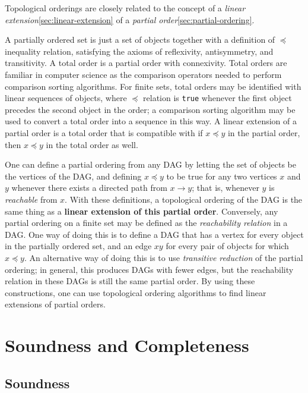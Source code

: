 Topological orderings are closely related to the concept of a
\textit{linear extension}\ref{sec:linear-extension} of a
\textit{partial order}\ref{sec:partial-ordering}.

A partially ordered set is just a set of objects together with a
definition of $\preceq$ inequality relation, satisfying the axioms of
reflexivity, antisymmetry, and transitivity. A total order is a
partial order with connexivity. Total orders are familiar in computer
science as the comparison operators needed to perform comparison
sorting algorithms. For finite sets, total orders may be identified
with linear sequences of objects, where $\preceq$ relation is
\texttt{true} whenever the first object precedes the second object in
the order; a comparison sorting algorithm may be used to convert a
total order into a sequence in this way. A linear extension of a
partial order is a total order that is compatible with if
$x \preceq y$ in the partial order, then $x \preceq y$ in the total
order as well.


One can define a partial ordering from any DAG by letting the set of
objects be the vertices of the DAG, and defining $x \preceq y$ to be
true for any two vertices $x$ and $y$ whenever there exists a directed
path from $x \to y$; that is, whenever $y$ is \textit{reachable} from
$x$. With these definitions, a topological ordering of the DAG is the
same thing as a \textbf{linear extension of this partial
  order}. Conversely, any partial ordering on a finite set may be
defined as the \textit{reachability relation} in a DAG. One way of
doing this is to define a DAG that has a vertex for every object in
the partially ordered set, and an edge $xy$ for every pair of objects
for which $x \preceq y$. An alternative way of doing this is to use
\textit{transitive reduction} of the partial ordering; in general,
this produces DAGs with fewer edges, but the reachability relation in
these DAGs is still the same partial order. By using these
constructions, one can use topological ordering algorithms to find
linear extensions of partial orders.




\newpage
\section{Soundness and Completeness}

\subsection{Soundness}


